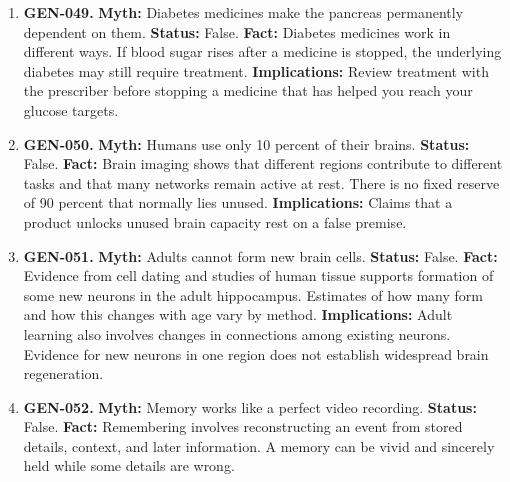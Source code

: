 \documentclass[11pt,oneside]{book}
\begin{document}
\begin{enumerate}[leftmargin=0pt,labelwidth=0pt,labelsep=0pt,itemindent=0pt]
\textbf{Fact:} Insulin replaces or supplements insulin the body cannot supply in adequate amounts. It is essential in type 1 diabetes and can be needed temporarily or long term in type 2 diabetes. \cite{ref173,ref224}\newline
\textbf{Implications:} Ask how to use insulin safely and recognize low blood sugar. Needing treatment is no measure of personal effort.
\item[] \textbf{GEN-049.} \textbf{Myth:} Diabetes medicines make the pancreas permanently dependent on them.\newline
\textbf{Status:} False.\newline
\textbf{Fact:} Diabetes medicines work in different ways. If blood sugar rises after a medicine is stopped, the underlying diabetes may still require treatment. \cite{ref173,ref224}\newline
\textbf{Implications:} Review treatment with the prescriber before stopping a medicine that has helped you reach your glucose targets.
\item[] \textbf{GEN-050.} \textbf{Myth:} Humans use only 10 percent of their brains.\newline
\textbf{Status:} False.\newline
\textbf{Fact:} Brain imaging shows that different regions contribute to different tasks and that many networks remain active at rest. There is no fixed reserve of 90 percent that normally lies unused. \cite{ref30}\newline
\textbf{Implications:} Claims that a product unlocks unused brain capacity rest on a false premise.
\item[] \textbf{GEN-051.} \textbf{Myth:} Adults cannot form new brain cells.\newline
\textbf{Status:} False.\newline
\textbf{Fact:} Evidence from cell dating and studies of human tissue supports formation of some new neurons in the adult hippocampus. Estimates of how many form and how this changes with age vary by method. \cite{ref248,ref301}\newline
\textbf{Implications:} Adult learning also involves changes in connections among existing neurons. Evidence for new neurons in one region does not establish widespread brain regeneration.
\item[] \textbf{GEN-052.} \textbf{Myth:} Memory works like a perfect video recording.\newline
\textbf{Status:} False.\newline
\textbf{Fact:} Remembering involves reconstructing an event from stored details, context, and later information. A memory can be vivid and sincerely held while some details are wrong. \cite{ref30}\newline

\end{enumerate}
\end{document}
